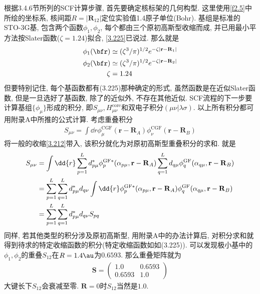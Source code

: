 根据3.4.6节所列的SCF计算步骤, 
首先要确定核标架的几何构型. 
这里使用\autoref{f2.5}中所绘的坐标系, 
核间距$R=|\mathbf{R}_{12}|$定位实验值1.4原子单位(Bohr). 
基组是标准的STO-3G基, 
包含两个函数$\phi_1,\phi_2$, 
每个都由三个原初高斯型收缩而成, 
并已用最小平方法按Slater函数($\zeta=1.24$)拟合, 
\autoref{3.225}已说过. 
那么就是
\begin{equation}
	\begin{split}
		\phi_1(\bfr) & \simeq (\zeta^3/\pi)^{1/2}e^{-\zeta|\mathbf{r-R}_1|}\\
		\phi_2(\bfr) & \simeq (\zeta^3/\pi)^{1/2}e^{-\zeta|\mathbf{r-R}_2|}\\
		\zeta & = 1.24
	\end{split}
\end{equation}
但要特别记住,
每个基函数都有(3.225)那种确定的形式, 
虽然函数是在近似Slater函数, 
但是一旦选好了基函数, 
除了\hft 的近似外, 
不存在其他近似. 
SCF流程的下一步要计算基组$\{\phi_\mu\}$形成的积分, 
即$S_{\mu\nu}, H_{\mu\nu}^\mathrm{core}$和双电子积分$(\mu\nu|\lambda\sigma)$. 
以上所有积分都可用附录A中所推的公式计算. 
考虑重叠积分
\begin{align}
	S_{\mu\nu} = \int\dd{r}\phi_\mu^\mathrm{CGF}(\mathbf{r-R}_A)\phi_\nu^\mathrm{CGF}(\mathbf{r-R}_B)
\end{align}
将一般的收缩\autoref{3.212}带入, 
该积分就化为对原初高斯型重叠积分的求和. 
就是
\begin{align}
	S_{\mu\nu} & = \int\dd{r}\sum_{p=1}^{L}d_{p\mu}^*\phi_p^\mathrm{GF*}(\alpha_{p\mu},\mathbf{r-R}_A)\sum_{q=1}^{L}d_{q\mu}\phi_q^\mathrm{GF}(\alpha_{q\mu},\mathbf{r-R}_B)\notag\\
	& = \sum_{p=1}^{L}\sum_{q=1}^{L} d_{p\mu}^*d_{q\nu}\int\dd{r}\phi_p^\mathrm{GF*}(\alpha_{p\mu},\mathbf{r-R}_A)\phi_q^\mathrm{GF}(\alpha_{q\mu},\mathbf{r-R}_B)\notag\\
	& = \sum_{p=1}^{L}\sum_{q=1}^{L}d^*_{p\mu}d_{q\nu}S_{pq}
\end{align}
同样, 
若其他类型的积分涉及原初高斯型, 
用附录A中的办法计算后, 
对积分求和就得到待求的特定收缩函数的积分(特定收缩函数如如(3.225)). 
可以发现极小基中的$\phi_1,\phi_2$的重叠$S_{12}$在$R=1.4\au$为$0.6593$. 
那么重叠矩阵就为
\begin{align}
	\mathbf{S} = 
	\begin{pmatrix}
		1.0 & 0.6593\\0.6593 & 1.0
	\end{pmatrix}
\end{align}
大键长下$S_{12}$会衰减至零. 
$\mathbf{R}=0$时$S_{12}$当然是$1.0$.

